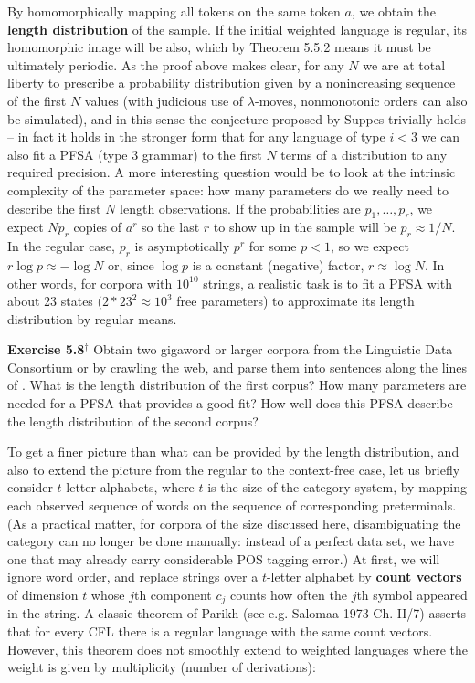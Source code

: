 By homomorphically mapping all tokens on the same token $a$, we obtain the
{\bf length distribution} of the sample.  
If the initial weighted language is regular, its homomorphic image will be
also, which by Theorem 5.5.2 means it must be ultimately periodic.  As the
proof above makes clear, for any $N$ we are at total liberty to prescribe a
probability distribution given by a nonincreasing sequence of the first $N$
values (with judicious use of $\lambda$-moves, nonmonotonic orders can also be
simulated), and in this sense the conjecture proposed by Suppes trivially
holds -- in fact it holds in the stronger form that for any language of type
$i<3$ we can also fit a PFSA (type 3 grammar) to the first $N$ terms of a
distribution to any required precision.  A more interesting question would be
to look at the intrinsic complexity of the parameter space: how many
parameters do we really need to describe the first $N$ length observations. If
the probabilities are $p_1, \ldots , p_r$, we expect $Np_r$ copies of $a^r$ so
the last $r$ to show up in the sample will be $p_r \approx 1/N$.  In the
regular case, $p_r$ is asymptotically $p^r$ for some $p<1$, so we expect
$r\log p \approx -\log N$ or, since $\log p$ is a constant (negative) factor,
$r \approx \log N$. In other words, for corpora with $10^{10}$ strings, a
realistic task is to fit a PFSA with about 23 states $(2*23^2 \approx 10^3$
free parameters) to approximate its length distribution by regular means.

\smallskip
\noindent
{\bf Exercise 5.8$^\dagger$} Obtain two gigaword or larger corpora from the
Linguistic Data Consortium or by crawling the web, and parse them into
sentences along the lines of . What is the length
distribution of the first corpus? How many parameters are needed for a PFSA
that provides a good fit? How well does this PFSA describe the length
distribution of the second corpus? 

\smallskip
To get a finer picture than what can be provided by the length distribution,
and also to extend the picture from the regular to the context-free case, let
us briefly consider $t$-letter alphabets, where $t$ is the size of the
category system, by mapping each observed sequence of words on the sequence of
corresponding preterminals.  (As a practical matter, for corpora of the size
discussed here, disambiguating the category can no longer be done manually:
instead of a perfect data set, we have one that may already carry considerable
POS tagging error.) At first, we will ignore word order, and replace strings
over a $t$-letter alphabet by {\bf count vectors} of dimension $t$ whose
$j$th component $c_j$ counts how often the $j$th symbol appeared in the
string.  A classic theorem of Parikh (see e.g.
Salomaa 1973 Ch. II/7) asserts that for every CFL there is a regular language
with the same count vectors.  However, this theorem does not smoothly extend to
weighted languages where the weight is given by multiplicity (number of
derivations):

